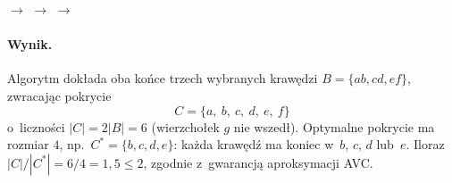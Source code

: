 \begin{azfigure}
	\centering
	\;$\rightarrow$\;%
	\;$\rightarrow$\;%
	\;$\rightarrow$\;%
\end{azfigure}

\paragraph{Wynik.}
Algorytm dokłada oba końce trzech wybranych krawędzi $B = \{ab, cd, ef\}$,
zwracając pokrycie
\[
	\boxed{C = \{a,\ b,\ c,\ d,\ e,\ f\}}
\]
o~liczności $|C| = 2|B| = 6$ (wierzchołek $g$ nie wszedł). Optymalne pokrycie ma
rozmiar $4$, np.\ $C^* = \{b, c, d, e\}$: każda krawędź ma koniec w~$b$, $c$, $d$
lub~$e$. Iloraz $|C| / |C^*| = 6/4 = 1{,}5 \leq 2$, zgodnie z~gwarancją
aproksymacji \textsc{AVC}.
